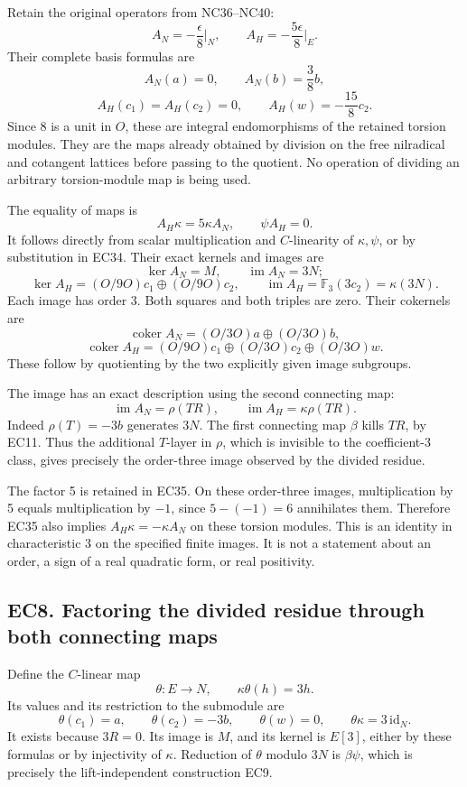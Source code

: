 \documentclass[
  10pt,
  a4paper,
]{article}
\begin{document}
Retain the original operators from NC36--NC40: \[
A_N=-\frac{\epsilon}{8}\Big|_N,\qquad
A_H=-\frac{5\epsilon}{8}\Big|_E.
\tag{EC33}
\] Their complete basis formulas are \[
A_N(a)=0,\qquad A_N(b)=\frac38b,
\] \[
A_H(c_1)=A_H(c_2)=0,\qquad
A_H(w)=-\frac{15}{8}c_2.
\tag{EC34}
\] Since 8 is a unit in \(O\), these are integral endomorphisms of the
retained torsion modules. They are the maps already obtained by division
on the free nilradical and cotangent lattices before passing to the
quotient. No operation of dividing an arbitrary torsion-module map is
being used.

The equality of maps is \[
A_H\kappa=5\kappa A_N,\qquad\psi A_H=0.
\tag{EC35}
\] It follows directly from scalar multiplication and \(C\)-linearity of
\(\kappa,\psi\), or by substitution in EC34. Their exact kernels and
images are \[
\ker A_N=M,\qquad\operatorname{im}A_N=3N;
\] \[
\ker A_H=(O/9O)c_1\oplus(O/9O)c_2,\qquad
\operatorname{im}A_H=\mathbb F_3(3c_2)=\kappa(3N).
\tag{EC36}
\] Each image has order 3. Both squares and both triples are zero. Their
cokernels are \[
\operatorname{coker}A_N=(O/3O)a\oplus(O/3O)b,
\] \[
\operatorname{coker}A_H=(O/9O)c_1\oplus
(O/3O)c_2\oplus(O/3O)w.
\] These follow by quotienting by the two explicitly given image
subgroups.

The image has an exact description using the second connecting map: \[
\operatorname{im}A_N=\rho(TR),\qquad
\operatorname{im}A_H=\kappa\rho(TR).
\tag{EC37}
\] Indeed \(\rho(T)=-3b\) generates \(3N\). The first connecting map
\(\beta\) kills \(TR\), by EC11. Thus the additional \(T\)-layer in
\(\rho\), which is invisible to the coefficient-3 class, gives precisely
the order-three image observed by the divided residue.

The factor 5 is retained in EC35. On these order-three images,
multiplication by 5 equals multiplication by \(-1\), since \(5-(-1)=6\)
annihilates them. Therefore EC35 also implies \(A_H\kappa=-\kappa A_N\)
on these torsion modules. This is an identity in characteristic 3 on the
specified finite images. It is not a statement about an order, a sign of
a real quadratic form, or real positivity.

\subsection{EC8. Factoring the divided residue through both connecting
maps}\label{ec8.-factoring-the-divided-residue-through-both-connecting-maps}

Define the \(C\)-linear map \[
\theta:E\longrightarrow N,\qquad
\kappa\theta(h)=3h.
\tag{EC38}
\] Its values and its restriction to the submodule are \[
\theta(c_1)=a,\qquad
\theta(c_2)=-3b,\qquad
\theta(w)=0,\qquad
\theta\kappa=3\,\mathrm{id}_N.
\tag{EC39}
\] It exists because \(3R=0\). Its image is \(M\), and its kernel is
\(E[3]\), either by these formulas or by injectivity of \(\kappa\).
Reduction of \(\theta\) modulo \(3N\) is \(\beta\psi\), which is
precisely the lift-independent construction EC9.
\end{document}
